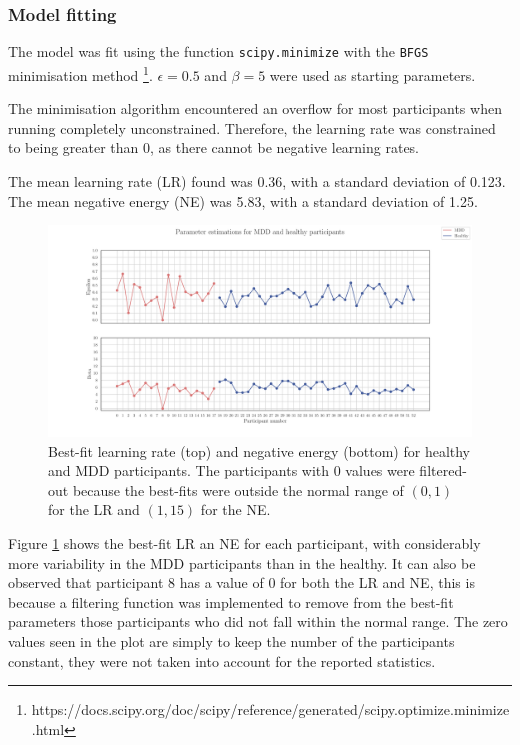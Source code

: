 \documentclass[12pt]{article}
\begin{document}
\subsubsection{Model fitting}

The model was fit using the function \texttt{scipy.minimize} with the \texttt{BFGS} minimisation method \footnote{https://docs.scipy.org/doc/scipy/reference/generated/scipy.optimize.minimize.html}. $\epsilon = 0.5$ and $\beta = 5$ were used as starting parameters.

The minimisation algorithm encountered an overflow for most participants when running completely unconstrained. Therefore, the learning rate was constrained to being greater than 0, as there cannot be negative learning rates.

The mean learning rate (LR) found was 0.36, with a standard deviation of 0.123. The mean negative energy (NE) was 5.83, with a standard deviation of 1.25. 

\begin{figure}[h!]
	\centering
	\hspace*{-0.6in}
	\includegraphics[width=1.2\linewidth]{figures/2.4.pdf}
	\caption{Best-fit learning rate (top) and negative energy (bottom) for healthy and MDD participants. The participants with 0 values were filtered-out because the best-fits were outside the normal range of $(0,1)$ for the LR and $(1, 15)$ for the NE.}
	\label{fig:2.4}
\end{figure}

Figure \ref{fig:2.4} shows the best-fit LR an NE for each participant, with considerably more variability in the MDD participants than in the healthy. It can also be observed that participant 8 has a value of 0 for both the LR and NE, this is because a filtering function was implemented to remove from the best-fit parameters those participants who did not fall within the normal range. The zero values seen in the plot are simply to keep the number of the participants constant, they were not taken into account for the reported statistics. 
\end{document}
